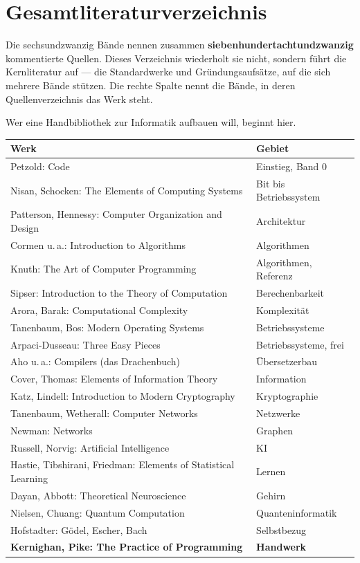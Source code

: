 \chapter{Gesamtliteraturverzeichnis}

Die sechsundzwanzig Bände nennen zusammen \textbf{siebenhundertachtundzwanzig} kommentierte Quellen. Dieses Verzeichnis wiederholt sie nicht, sondern führt die Kernliteratur auf --- die Standardwerke und Gründungsaufsätze, auf die sich mehrere Bände stützen. Die rechte Spalte nennt die Bände, in deren Quellenverzeichnis das Werk steht.

\begin{merksatz}
Wer eine Handbibliothek zur Informatik aufbauen will, beginnt hier.

\begin{center}
{\small
\renewcommand{\arraystretch}{1.34}
\begin{longtable}{@{}P{5.8cm}P{2.8cm}@{}}
\toprule
\textbf{Werk} & \textbf{Gebiet}\\
\midrule
\endhead
Petzold: Code & Einstieg, Band 0\\
Nisan, Schocken: The Elements of Computing Systems & Bit bis Betriebssystem\\
Patterson, Hennessy: Computer Organization and Design & Architektur\\
Cormen u.\,a.: Introduction to Algorithms & Algorithmen\\
Knuth: The Art of Computer Programming & Algorithmen, Referenz\\
Sipser: Introduction to the Theory of Computation & Berechenbarkeit\\
Arora, Barak: Computational Complexity & Komplexität\\
Tanenbaum, Bos: Modern Operating Systems & Betriebssysteme\\
Arpaci-Dusseau: Three Easy Pieces & Betriebssysteme, frei\\
Aho u.\,a.: Compilers (das Drachenbuch) & Übersetzerbau\\
Cover, Thomas: Elements of Information Theory & Information\\
Katz, Lindell: Introduction to Modern Cryptography & Kryptographie\\
Tanenbaum, Wetherall: Computer Networks & Netzwerke\\
Newman: Networks & Graphen\\
Russell, Norvig: Artificial Intelligence & KI\\
Hastie, Tibshirani, Friedman: Elements of Statistical Learning & Lernen\\
Dayan, Abbott: Theoretical Neuroscience & Gehirn\\
Nielsen, Chuang: Quantum Computation & Quanten\-informatik\\
Hofstadter: Gödel, Escher, Bach & Selbstbezug\\
\textbf{Kernighan, Pike: The Practice of Programming} & \textbf{Handwerk}\\
\bottomrule
\end{longtable}}
\end{center}


\end{merksatz}

